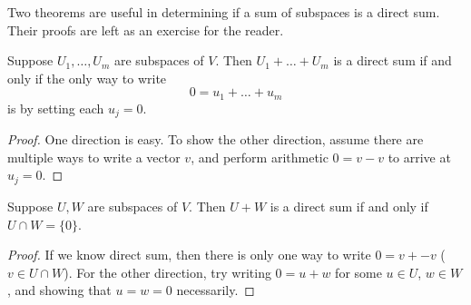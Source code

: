 \documentclass[math0540-lecture-notes.tex]{subfiles}
\begin{document}
Two theorems are useful in determining if a sum of subspaces is a direct sum. Their proofs are left
as an exercise for the reader.
\begin{theorem}{}
  Suppose $U_1,\ldots,U_m$ are subspaces of $V$. Then $U_1+\ldots+U_m$ is a direct sum if and only
  if the only way to write \[
    0 = u_1+\ldots+u_m
  \] is by setting each $u_j=0$.
\end{theorem}
\begin{proof}[Proof]
  One direction is easy. To show the other direction, assume there are multiple ways to write a
  vector $v$, and perform arithmetic $0=v-v$ to arrive at $u_j=0$.
\end{proof}

\begin{theorem}{}
  Suppose $U,W$ are subspaces of $V$. Then $U+W$ is a direct sum if and only if $U\cap W=\{ 0 \}$.
\end{theorem}
\begin{proof}[Proof]
  If we know direct sum, then there is only one way to write $0=v+ -v$ ($v\in U\cap W$). For the
  other direction, try writing $0=u+w$ for some $u\in U$, $w\in W$, and showing that $u=w=0$ 
  necessarily.
\end{proof}
\end{document}
